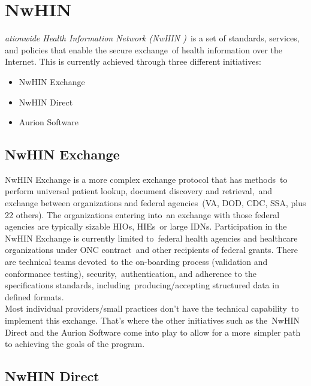   \section[Nationwide Health Information Network (NwHIN)]{NwHIN}
  \label{sec:nwhin}

  \textit{ationwide Health Information Network (NwHIN )}\
  is a set of standards, services, and policies that enable the secure exchange\
  of health information over the Internet. \citep{_nwhin_framework_2013}
 This is currently achieved through three different initiatives:\
  \begin{itemize}
    \itemsep0ex
    \item  NwHIN Exchange
    \item  NwHIN Direct 
    \item Aurion Software
  \end{itemize}

  \subsection{NwHIN Exchange}

 	NwHIN Exchange is a more complex exchange protocol that has methods\
to perform universal patient lookup, document discovery and retrieval,\
 and exchange between organizations and federal agencies\
 (VA, DOD, CDC, SSA, plus 22 others). The organizations entering into\
 an exchange with those federal agencies are typically sizable HIOs, HIEs\
or large IDNs. Participation in the NwHIN Exchange is currently limited to\
federal health agencies and healthcare organizations under ONC contract\
 and other recipients of federal grants. There are technical teams devoted\
 to the on-boarding process (validation and conformance testing), security,\
 authentication, and adherence to the specifications standards, including\
 producing/accepting structured data in defined formats.\
\citep{_nwhin_exchange_2013}\\

  \noindent Most individual providers/small practices don't have the technical capability\
 to implement this exchange. That's where the other initiatives such as the\
NwHIN Direct and the Aurion Software come into play to allow for a more\
 simpler path to achieving the goals of the program.\\

 \subsection{NwHIN Direct}

